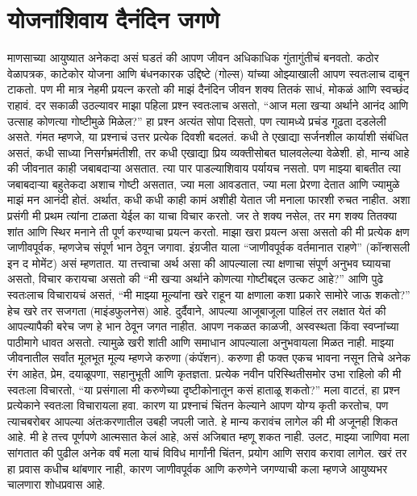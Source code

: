  \chapter{योजनांशिवाय दैनंदिन जगणे}
माणसाच्या आयुष्यात अनेकदा असं घडतं की आपण जीवन अधिकाधिक गुंतागुंतीचं बनवतो. कठोर वेळापत्रक, काटेकोर योजना आणि बंधनकारक उद्दिष्टे (गोल्स) यांच्या ओझ्याखाली आपण स्वतःलाच दाबून टाकतो. पण मी मात्र नेहमी प्रयत्न करतो की माझं दैनंदिन जीवन शक्य तितकं साधं, मोकळं आणि स्वच्छंद राहावं.
दर सकाळी उठल्यावर माझा पहिला प्रश्न स्वतःलाच असतो, “आज मला खऱ्या अर्थाने आनंद आणि उत्साह कोणत्या गोष्टीमुळे मिळेल?” हा प्रश्न अत्यंत सोपा दिसतो, पण त्यामध्ये प्रचंड गूढता दडलेली असते. गंमत म्हणजे, या प्रश्नाचं उत्तर प्रत्येक दिवशी बदलतं. कधी ते एखाद्या सर्जनशील कार्याशी संबंधित असतं, कधी साध्या निसर्गभ्रमंतीशी, तर कधी एखाद्या प्रिय व्यक्तीसोबत घालवलेल्या वेळेशी.
हो, मान्य आहे की जीवनात काही जबाबदाऱ्या असतात. त्या पार पाडल्याशिवाय पर्यायच नसतो. पण माझ्या बाबतीत त्या जबाबदाऱ्या बहुतेकदा अशाच गोष्टी असतात, ज्या मला आवडतात, ज्या मला प्रेरणा देतात आणि ज्यामुळे माझं मन आनंदी होतं. अर्थात, कधी कधी काही कामं अशीही येतात जी मनाला फारशी रुचत नाहीत. अशा प्रसंगी मी प्रथम त्यांना टाळता येईल का याचा विचार करतो. जर ते शक्य नसेल, तर मग शक्य तितक्या शांत आणि स्थिर मनाने ती पूर्ण करण्याचा प्रयत्न करतो.
माझा खरा प्रयत्न असा असतो की मी प्रत्येक क्षण जाणीवपूर्वक, म्हणजेच संपूर्ण भान ठेवून जगावा. इंग्रजीत याला “जाणीवपूर्वक वर्तमानात राहणे” (कॉन्शसली इन द मोमेंट) असं म्हणतात. या तत्त्वाचा अर्थ असा की आपल्याला त्या क्षणाचा संपूर्ण अनुभव घ्यायचा असतो, विचार करायचा असतो की “मी खऱ्या अर्थाने कोणत्या गोष्टीबद्दल उत्कट आहे?” आणि पुढे स्वतःलाच विचारायचं असतं, “मी माझ्या मूल्यांना खरे राहून या क्षणाला कशा प्रकारे सामोरे जाऊ शकतो?” हेच खरे तर सजगता (माइंडफुलनेस) आहे.
दुर्दैवाने, आपल्या आजूबाजूला पाहिलं तर लक्षात येतं की आपल्यापैकी बरेच जण हे भान ठेवून जगत नाहीत. आपण नकळत काळजी, अस्वस्थता किंवा स्वप्नांच्या पाठीमागे धावत असतो. त्यामुळे खरी शांती आणि समाधान आपल्याला अनुभवायला मिळत नाही.
माझ्या जीवनातील सर्वांत मूलभूत मूल्य म्हणजे करुणा (कंपॅशन). करुणा ही फक्त एकच भावना नसून तिचे अनेक रंग आहेत, प्रेम, दयाळूपणा, सहानुभूती आणि कृतज्ञता. प्रत्येक नवीन परिस्थितीसमोर उभा राहिलो की मी स्वतःला विचारतो, “या प्रसंगाला मी करुणेच्या दृष्टीकोनातून कसं हाताळू शकतो?” मला वाटतं, हा प्रश्न प्रत्येकाने स्वतःला विचारायला हवा. कारण या प्रश्नाचं चिंतन केल्याने आपण योग्य कृती करतोच, पण त्याचबरोबर आपल्या अंतःकरणातील उबही जपली जाते.
हे मान्य करावंच लागेल की मी अजूनही शिकत आहे. मी हे तत्त्व पूर्णपणे आत्मसात केलं आहे, असं अजिबात म्हणू शकत नाही. उलट, माझ्या जाणिवा मला सांगतात की पुढील अनेक वर्षं मला याचं विविध मार्गांनी चिंतन, प्रयोग आणि सराव करावा लागेल. खरं तर हा प्रवास कधीच थांबणार नाही, कारण जाणीवपूर्वक आणि करुणेने जगण्याची कला म्हणजे आयुष्यभर चालणारा शोधप्रवास आहे.

